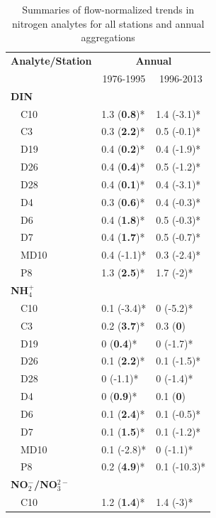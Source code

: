 \documentclass[letterpaper,12pt,oneside]{article}\usepackage[]{graphicx}\usepackage[]{color}
\begin{document}
\begin{table}[!tbp]
\caption{Summaries of flow-normalized trends in nitrogen analytes for all stations and annual aggregations\label{tab:trndsann}} 
\begin{center}
\begin{tabular}{lll}
\hline\hline
\multicolumn{1}{l}{\bfseries Analyte/Station}&\multicolumn{2}{c}{\bfseries Annual}\tabularnewline
\cline{2-3}
\multicolumn{1}{l}{}&\multicolumn{1}{c}{1976-1995}&\multicolumn{1}{c}{1996-2013}\tabularnewline
\hline
{\bfseries DIN}&&\tabularnewline
~~C10&1.3 \footnotesize{(\textbf{0.8})*}&1.4 \footnotesize{(-3.1)*}\tabularnewline
~~C3&0.3 \footnotesize{(\textbf{2.2})*}&0.5 \footnotesize{(-0.1)*}\tabularnewline
~~D19&0.4 \footnotesize{(\textbf{0.2})*}&0.4 \footnotesize{(-1.9)*}\tabularnewline
~~D26&0.4 \footnotesize{(\textbf{0.4})*}&0.5 \footnotesize{(-1.2)*}\tabularnewline
~~D28&0.4 \footnotesize{(\textbf{0.1})*}&0.4 \footnotesize{(-3.1)*}\tabularnewline
~~D4&0.3 \footnotesize{(\textbf{0.6})*}&0.4 \footnotesize{(-0.3)*}\tabularnewline
~~D6&0.4 \footnotesize{(\textbf{1.8})*}&0.5 \footnotesize{(-0.3)*}\tabularnewline
~~D7&0.4 \footnotesize{(\textbf{1.7})*}&0.5 \footnotesize{(-0.7)*}\tabularnewline
~~MD10&0.4 \footnotesize{(-1.1)*}&0.3 \footnotesize{(-2.4)*}\tabularnewline
~~P8&1.3 \footnotesize{(\textbf{2.5})*}&1.7 \footnotesize{(-2)*}\tabularnewline
\hline
{\bfseries NH$_{4}^{+}$}&&\tabularnewline
~~C10&0.1 \footnotesize{(-3.4)*}&0 \footnotesize{(-5.2)*}\tabularnewline
~~C3&0.2 \footnotesize{(\textbf{3.7})*}&0.3 \footnotesize{(\textbf{0})}\tabularnewline
~~D19&0 \footnotesize{(\textbf{0.4})*}&0 \footnotesize{(-1.7)*}\tabularnewline
~~D26&0.1 \footnotesize{(\textbf{2.2})*}&0.1 \footnotesize{(-1.5)*}\tabularnewline
~~D28&0 \footnotesize{(-1.1)*}&0 \footnotesize{(-1.4)*}\tabularnewline
~~D4&0 \footnotesize{(\textbf{0.9})*}&0.1 \footnotesize{(\textbf{0})}\tabularnewline
~~D6&0.1 \footnotesize{(\textbf{2.4})*}&0.1 \footnotesize{(-0.5)*}\tabularnewline
~~D7&0.1 \footnotesize{(\textbf{1.5})*}&0.1 \footnotesize{(-1.2)*}\tabularnewline
~~MD10&0.1 \footnotesize{(-2.8)*}&0 \footnotesize{(-1.1)*}\tabularnewline
~~P8&0.2 \footnotesize{(\textbf{4.9})*}&0.1 \footnotesize{(-10.3)*}\tabularnewline
\hline
{\bfseries NO$_{2}^{-}$/NO$_{3}^{2-}$}&&\tabularnewline
~~C10&1.2 \footnotesize{(\textbf{1.4})*}&1.4 \footnotesize{(-3)*}\tabularnewline

\end{tabular}
\end{center}
\end{table}
\end{document}
